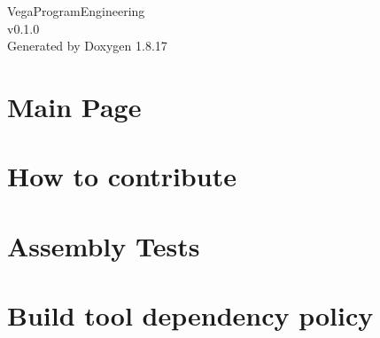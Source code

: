 \let\mypdfximage\pdfximage\def\pdfximage{\immediate\mypdfximage}\documentclass[twoside]{book}
\newcommand{\+}{\discretionary{\mbox{\scriptsize$\hookleftarrow$}}{}{}}
\newcommand{\clearemptydoublepage}{%
  \newpage{\pagestyle{empty}\cleardoublepage}%
}
\begin{document}
\hypersetup{pageanchor=false,
             bookmarksnumbered=true,
             pdfencoding=unicode
            }
\begin{titlepage}
\vspace*{7cm}
\begin{center}%
{\Large Vega\+Program\+Engineering \\[1ex]\large v0.\+1.\+0 }\\
\vspace*{1cm}
{\large Generated by Doxygen 1.8.17}\\
\end{center}
\end{titlepage}
\clearemptydoublepage
{}
\tableofcontents
\clearemptydoublepage
{}
\hypersetup{pageanchor=true}

\chapter{Main Page}
\label{index}\hypertarget{index}{}
\chapter{How to contribute}
\label{md__home_mary_VegaProgramEngineering_2024_build__deps_googlebenchmark-src_CONTRIBUTING}

\chapter{Assembly Tests}
\label{md__home_mary_VegaProgramEngineering_2024_build__deps_googlebenchmark-src_docs_AssemblyTests}

\chapter{Build tool dependency policy}
\label{md__home_mary_VegaProgramEngineering_2024_build__deps_googlebenchmark-src_docs_dependencies}

\end{document}
